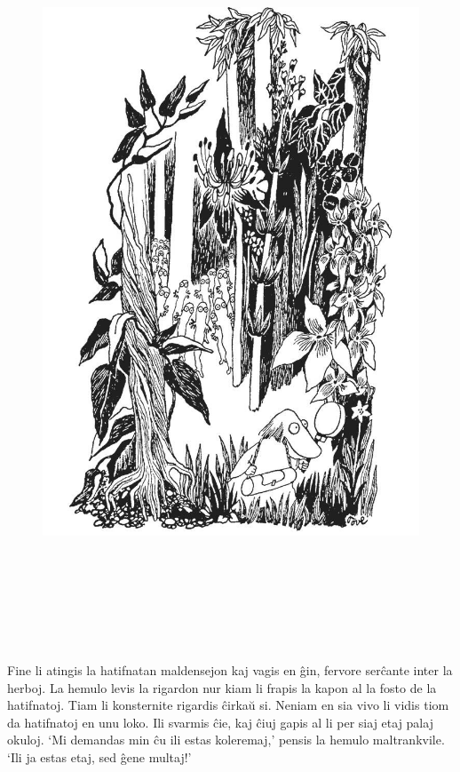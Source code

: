 \begin{figure}[htbp]
\centering
\includegraphics[width=450pt,height=631pt]{_14.jpg}
\caption{}
\label{_14}
\end{figure}

Fine li atingis la hatifnatan maldensejon kaj vagis en ĝin, fervore serĉante inter la herboj. La hemulo levis la rigardon nur kiam li frapis la kapon al la fosto de la hatifnatoj. Tiam li konsternite rigardis ĉirkaŭ si. Neniam en sia vivo li vidis tiom da hatifnatoj en unu loko. Ili svarmis ĉie, kaj ĉiuj gapis al li per siaj etaj palaj okuloj. `Mi demandas min ĉu ili estas koleremaj,' pensis la hemulo maltrankvile. `Ili ja estas etaj, sed ĝene multaj!'

